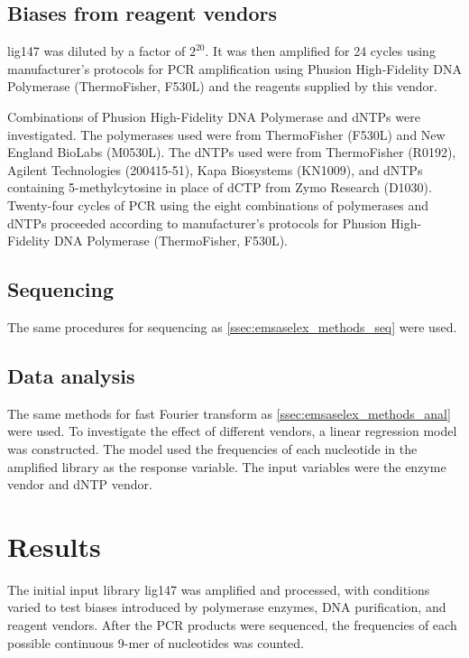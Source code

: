 \documentclass[parskip=full, numbers=noenddot]{scrreprt}
\begin{document}
\subsection{Biases from reagent vendors}
\label{ssec:pcrbias_methods_reagent}

lig147 was diluted by a factor of $2^{20}$.  It was then amplified for 24 cycles using manufacturer's protocols for PCR amplification using Phusion High-Fidelity DNA Polymerase (ThermoFisher, F530L) and the reagents supplied by this vendor.

Combinations of Phusion High-Fidelity DNA Polymerase and dNTPs were investigated.  The polymerases used were from ThermoFisher (F530L) and New England BioLabs (M0530L).  The dNTPs used were from ThermoFisher (R0192), Agilent Technologies (200415-51), Kapa Biosystems (KN1009), and dNTPs containing 5-methylcytosine in place of dCTP from Zymo Research (D1030).  Twenty-four cycles of PCR using the eight combinations of polymerases and dNTPs proceeded according to manufacturer's protocols for Phusion High-Fidelity DNA Polymerase (ThermoFisher, F530L).

\subsection{Sequencing}
\label{ssec:pcrbias_methods_seq}

The same procedures for sequencing as \ref{ssec:emsaselex_methods_seq} were used.

\subsection{Data analysis}
\label{ssec:pcrbias_methods_anal}

The same methods for fast Fourier transform as \ref{ssec:emsaselex_methods_anal} were used.  To investigate the effect of different vendors, a linear regression model was constructed.  The model used the frequencies of each nucleotide in the amplified library as the response variable.  The input variables were the enzyme vendor and dNTP vendor.

\section{Results}
\label{sec:pcrbias_results}

The initial input library lig147 was amplified and processed, with conditions varied to test biases introduced by polymerase enzymes, DNA purification, and reagent vendors.  After the PCR products were sequenced, the frequencies of each possible continuous 9-mer of nucleotides was counted.
\end{document}
